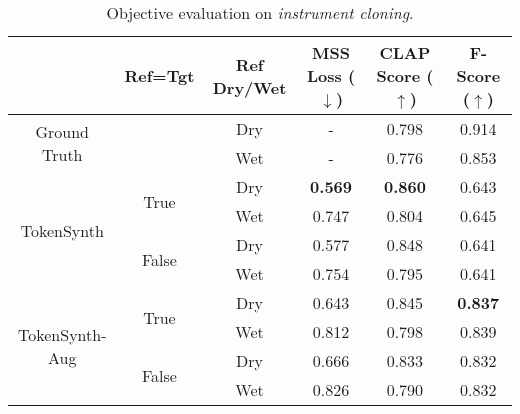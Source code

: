 \begin{table*}[t!]
\centering
\begin{tabular}{cccccc}
\hline
 & Ref=Tgt & Ref Dry/Wet & MSS Loss ($\downarrow$) & CLAP Score ($\uparrow$)& F-Score ($\uparrow$)\\ \hline
\multirow{2}{*}{Ground Truth} &  & Dry & - & 0.798 & 0.914 \\
 &  & Wet & - & 0.776 & 0.853 \\ \hline
\multirow{4}{*}{TokenSynth} & \multirow{2}{*}{True} & Dry & {\textbf{0.569}} & {\textbf{0.860}} & 0.643 \\
 &  & Wet & 0.747 & 0.804 & 0.645 \\ \cline{2-2}
 & \multirow{2}{*}{False} & Dry & 0.577 & 0.848 & 0.641 \\
 &  & Wet & 0.754 & 0.795 & 0.641 \\ \cline{1-2}
\multirow{4}{*}{TokenSynth-Aug} & \multirow{2}{*}{True} & Dry & 0.643 & 0.845 & {\textbf{0.837}} \\
 &  & Wet & 0.812 & 0.798 & 0.839 \\ \cline{2-2}
 & \multirow{2}{*}{False} & Dry & 0.666 & 0.833 & 0.832 \\
 &  & Wet & 0.826 & 0.790 & 0.832 \\ \hline
\end{tabular}
\caption{Objective evaluation on \textit{instrument cloning}.}
\label{table:cloning_objective}
\end{table*}

